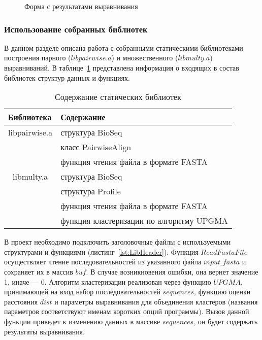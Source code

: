 \begin{figure}[h]
	\caption{Форма с результатами выравнивания}
	\label{ris:webkares}
\end{figure}

\subsubsection[Использование собранных библиотек]{\large Использование собранных библиотек}
\hspace{\parindent} В данном разделе описана работа с собранными статическими библиотеками построения парного ($libpairwise.a$) и множественного ($libmulty.a$) выравниваний. В таблице~\ref{tabular:staticlibs} представлена информация о входящих в состав библиотек структур данных и функциях.

\begin{table}[h]
\caption{Содержание статических библиотек}
\centering
\begin{tabular}{|l|l|}
\hline
Библиотека & Содержание \\ \hline
\multicolumn{ 1}{|c|}{libpairwise.a} & структура BioSeq \\ \cline{ 2- 2}
\multicolumn{ 1}{|l|}{} & класс PairwiseAlign \\ \cline{ 2- 2}
\multicolumn{ 1}{|l|}{} & функция чтения файла в формате FASTA \\ \hline
\multicolumn{ 1}{|c|}{libmulty.a} & структура BioSeq \\ \cline{ 2- 2}
\multicolumn{ 1}{|l|}{} & структура Profile \\ \cline{ 2- 2}
\multicolumn{ 1}{|l|}{} & функция чтения файла в формате FASTA \\ \cline{ 2- 2}
\multicolumn{ 1}{|l|}{} & функция кластеризации по алгоритму UPGMA \\ \hline
\end{tabular}
\label{tabular:staticlibs}
\end{table}

В проект необходимо подключить заголовочные файлы с используемыми структурами и функциями (листинг~\ref{lst:LibHeader}). Функция $ReadFastaFile$ осуществляет чтение последовательностей из указанного файла $input\_fasta$ и сохраняет их в массив $buf$. В случае возникновения ошибки, она вернет значение 1, иначе --- 0. Алгоритм кластеризации реализован через функцию $UPGMA$, принимающей на вход набор последовательностей $sequences$, функцию оценки расстояния $dist$ и параметры выравнивания для объединения кластеров (названия параметров соответствуют именам коротких опций программы). Вызов данной функции приведет к изменению данных в массиве $sequences$, он будет содержать результаты выравнивания.

